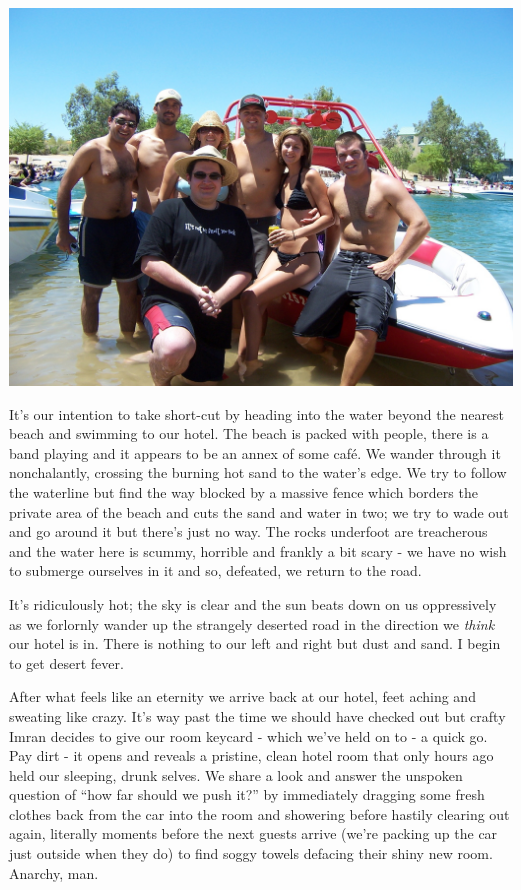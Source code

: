 \documentclass[a5paper,titlepage,11pt]{book}
\begin{document}
\begin{center}\includegraphics[width=\textwidth]{gfx/100_1604}\end{center}

It's our intention to take short-cut by heading into the water beyond the nearest beach and swimming to our hotel. The beach is packed with people, there is a band playing and it appears to be an annex of some caf\'{e}. We wander through it nonchalantly, crossing the burning hot sand to the water's edge. We try to follow the waterline but find the way blocked by a massive fence which borders the private area of the beach and cuts the sand and water in two; we try to wade out and go around it but there's just no way. The rocks underfoot are treacherous and the water here is scummy, horrible and frankly a bit scary - we have no wish to submerge ourselves in it and so, defeated, we return to the road.

It's ridiculously hot; the sky is clear and the sun beats down on us oppressively as we forlornly wander up the strangely deserted road in the direction we \emph{think} our hotel is in. There is nothing to our left and right but dust and sand. I begin to get desert fever.

After what feels like an eternity we arrive back at our hotel, feet aching and sweating like crazy. It's way past the time we should have checked out but crafty Imran decides to give our room keycard - which we've held on to - a quick go. Pay dirt - it opens and reveals a pristine, clean hotel room that only hours ago held our sleeping, drunk selves. We share a look and answer the unspoken question of ``how far should we push it?'' by immediately dragging some fresh clothes back from the car into the room and showering before hastily clearing out again, literally moments before the next guests arrive (we're packing up the car just outside when they do) to find soggy towels defacing their shiny new room. Anarchy, man.
\end{document}

